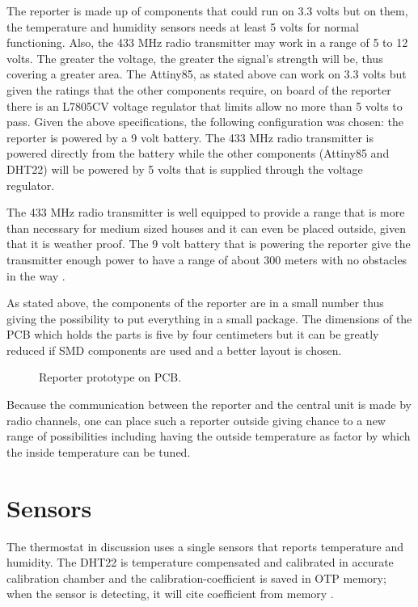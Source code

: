 The reporter is made up of components that could run on 3.3 volts but on them, the temperature and humidity
sensors needs at least 5 volts for normal functioning. Also, the 433 MHz radio transmitter may work in a range
of 5 to 12 volts. The greater the voltage, the greater the signal's strength will be, thus covering a greater
area. The Attiny85, as stated above can work on 3.3 volts but given the ratings that the other components
require, on board of the reporter there is an L7805CV voltage regulator that limits allow no more than
5 volts to pass. Given the above specifications, the following configuration was chosen: the reporter is
powered by a 9 volt battery. The 433 MHz radio transmitter is powered directly from the battery while the
other components (Attiny85 and DHT22) will be powered by 5 volts that is supplied through the voltage
regulator.

The 433 MHz radio transmitter is well equipped to provide a range that is more than necessary for medium
sized houses and it can even be placed outside, given that it is weather proof. The 9 volt battery that is
powering the reporter give the transmitter enough power to have a range of about 300 meters with no obstacles
in the way \cite{datasheet:radio_tx}.

As stated above, the components of the reporter are in a small number thus giving the possibility to put
everything in a small package. The dimensions of the PCB which holds the parts is five by four centimeters
but it can be greatly reduced if SMD components are used and a better layout is chosen.

\begin{figure}[h!]
    \label{fig:reporter}
    \centerline{}
    \caption[Reporter Prototype On PCB]{Reporter prototype on PCB.}
    \label{fig:reporter}
\end{figure}

Because the communication between the reporter and the central unit is made by radio channels, one can place
such a reporter outside giving chance to a new range of possibilities including having the outside temperature
as factor by which the inside temperature can be tuned.

\section{Sensors}
\label{sec:sensors}

The thermostat in discussion uses a single sensors that reports temperature and humidity.
The DHT22 is temperature compensated and calibrated in accurate calibration chamber and the
calibration-coefficient is saved in OTP memory; when the sensor is detecting, it will cite
coefficient from memory \cite{datasheet:dht22}.

